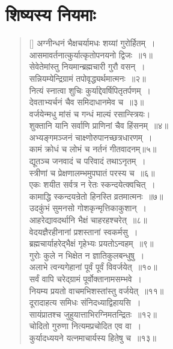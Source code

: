 \documentclass[twoside,12pt,notitlepage]{book}
\begin{document}
\section{शिष्यस्य नियमाः}
\begin{verse}[\versewidth]
अग्नीन्धनं भैक्षचर्यामधः शय्यां गुरोर्हितम्~।\\[-6pt]
आसमावर्तनात्कुर्यात्कृतोपनयनो द्विजः~॥१॥\footA \\
सेवेतेमांस्तु नियमान्ब्रह्मचारी गुरौ वसन्~।\\[-6pt]
सन्नियम्येन्द्रिग्रामं तपोवृद्ध्यर्थमात्मनः~॥२॥\\
नित्यं स्नात्वा शुचिः कुर्याद्देवर्षिपितृतर्पणम्~।\\[-6pt]
देवताभ्यर्चनं चैव समिदाधानमेव च~॥३॥\\
वर्जयेन्मधु मांसं च गन्धं माल्यं रसान्स्त्रियः।\\[-6pt]
शुक्तानि यानि सर्वाणि प्राणिनां चैव हिंसनम्~॥४॥\footA \\
अभ्यङ्गमञ्जनं चाक्ष्णोरुपानच्छत्रधारणम्~।\\[-6pt]
कामं क्रोधं च लोभं च नर्तनं गीतवादनम्॥५॥\\
द्यूतञ्च जनवादं च परिवादं तथाऽनृतम्~।\\[-6pt]
स्त्रीणां च प्रेक्षणालम्भमुपघातं परस्य च~॥६॥\footA \\
एकः शयीत सर्वत्र न रेतः स्कन्दयेत्क्वचित्~।\\[-6pt]
कामाद्धि स्कन्दयन्रेतो हिनस्ति व्रतमात्मनः~॥७॥\footA \\
उदकुंभं सुमनसो गोशकृन्मृत्तिकाकुशान्~।\\[-6pt]
आहरेद्यावदर्थानि भैक्षं चाहरहश्चरेत्~॥८॥\footA \\
वेदयज्ञैरहीनानां प्रशस्तानां स्वकर्मसु~।\\[-6pt]
ब्रह्मचार्याहरेद्भैक्षं गृहेभ्यः प्रयतोऽन्वहम्~॥९॥\\
गुरोः कुले न भिक्षेत न ज्ञातिकुलबन्धुषु~।\\[-6pt]
अलाभे त्वन्यगेहानां पूर्वं पूर्वं विवर्जयेत्~॥१०॥\\
सर्वं वापि चरेद्ग्रामं पूर्वोक्तानामसम्भवे~।\\[-6pt]
नियम्य प्रयतो वाचमभिशस्तांस्तु वर्जयेत्~॥११॥\footA \\
दूरादाहत्य समिधः संनिदध्याद्विहायसि~।\\[-6pt]
सायंप्रातश्च जुहुयात्ताभिरग्निमतन्द्रितः~॥१२॥\\
चोदितो गुरुणा नित्यमप्रचोदित एव वा~।\\[-6pt]
कुर्यादध्ययने यत्नमाचार्यस्य हितेषु च~॥१३॥\\

\end{verse}
\end{document}
